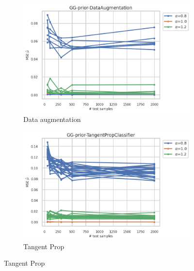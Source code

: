 \begin{figure}[ht!]
  \begin{subfigure}[t]{0.49\linewidth}
    \includegraphics[width=\linewidth]{COMPARE/GG-prior/DataAugmentation/profusion_n_samples_mse.png}
    \caption{Data augmentation}
  \end{subfigure}%
  \hfill
  \begin{subfigure}[t]{0.49\linewidth}
    \includegraphics[width=\linewidth]{COMPARE/GG-prior/TangentPropClassifier/profusion_n_samples_mse.png}
    \caption{Tangent Prop}
  \end{subfigure}


\end{figure}

